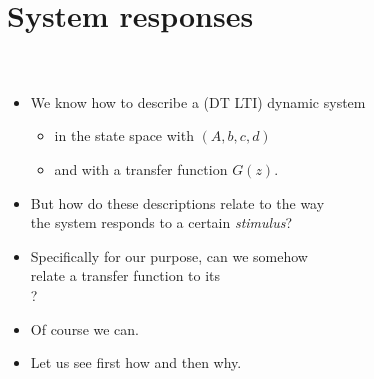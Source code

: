 \section{System responses}
\subsection{}

\begin{frame}\mccz
{}
\framesubtitleTC{}
\myPause
 \begin{columns}
   \myPause%
   \begin{itemize}[<+-| alert@+>]
   \item We know how to describe a (DT LTI) dynamic system
         \begin{itemize}[<+-| alert@+>]
         \item in the state space with $(A,b,c,d)$
         \item and with a transfer function $G(z)$.
         \end{itemize}
   \item But how do these descriptions relate to the way\\
         the system responds to a certain \emph{stimulus}?
   \item Specifically for our purpose, can we somehow\\
         relate a transfer function to its\\
         ?
   \item \vspace{3mm} Of course we can.
   \item Let us see first how and then why.
   \end{itemize}
 \end{columns}
\end{frame}

